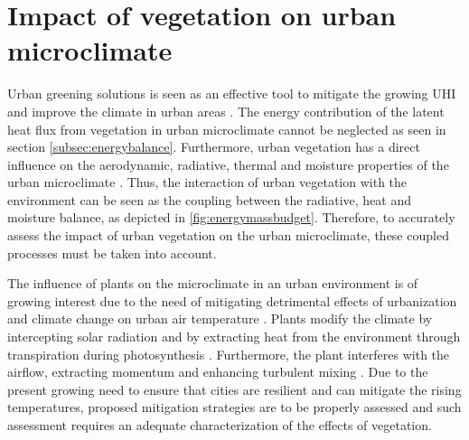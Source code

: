 \section{Impact of vegetation on urban microclimate}

Urban greening solutions is seen as an effective tool to mitigate the growing UHI and improve the climate in urban areas \citep{Gillner2015, Bowler2010, Loughner2012}.  The energy contribution of the latent heat flux from vegetation in urban microclimate cannot be neglected as seen in section \ref{subsec:energybalance}. Furthermore, urban vegetation has a direct influence on the aerodynamic, radiative, thermal and moisture properties of the urban microclimate \citep{Oke1989}. Thus, the interaction of urban vegetation with the environment can be seen as the coupling between the radiative, heat and moisture balance, as depicted in \cref{fig:energymassbudget}. Therefore, to accurately assess the impact of urban vegetation on the urban microclimate, these coupled processes must be taken into account.
	
The influence of plants on the microclimate in an urban environment is of growing interest due to the need of mitigating detrimental effects of urbanization and climate change on urban air temperature \citep{Chen2006,Demuzere2014,Dimoudi2003,Matthews2017,Shashua-Bar2009b,Shashua-Bar2000a}. Plants modify the climate by intercepting solar radiation and by extracting heat from the environment through transpiration during photosynthesis \citep{nobel2009physicochemical}. Furthermore, the plant interferes with the airflow, extracting momentum and enhancing turbulent mixing \citep{Finnigan2009, Gromke2014, Sanz2003}. Due to the present growing need to ensure that cities are resilient and can mitigate the rising temperatures, proposed mitigation strategies are to be properly assessed and such assessment requires an adequate characterization of the effects of vegetation. 

